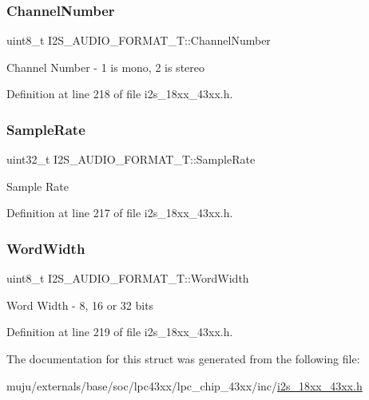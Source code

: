 \subsubsection{\texorpdfstring{Channel\+Number}{ChannelNumber}}
{\footnotesize\ttfamily uint8\+\_\+t I2\+S\+\_\+\+A\+U\+D\+I\+O\+\_\+\+F\+O\+R\+M\+A\+T\+\_\+\+T\+::\+Channel\+Number}

Channel Number -\/ 1 is mono, 2 is stereo 

Definition at line 218 of file i2s\+\_\+18xx\+\_\+43xx.\+h.

\mbox{\label{struct_i2_s___a_u_d_i_o___f_o_r_m_a_t___t_aef370fad5b70b5226a2f8a780bd934d9}} 
\subsubsection{\texorpdfstring{Sample\+Rate}{SampleRate}}
{\footnotesize\ttfamily uint32\+\_\+t I2\+S\+\_\+\+A\+U\+D\+I\+O\+\_\+\+F\+O\+R\+M\+A\+T\+\_\+\+T\+::\+Sample\+Rate}

Sample Rate 

Definition at line 217 of file i2s\+\_\+18xx\+\_\+43xx.\+h.

\mbox{\label{struct_i2_s___a_u_d_i_o___f_o_r_m_a_t___t_a5b21d5d739e0eb7e66c898618fcd4605}} 
\subsubsection{\texorpdfstring{Word\+Width}{WordWidth}}
{\footnotesize\ttfamily uint8\+\_\+t I2\+S\+\_\+\+A\+U\+D\+I\+O\+\_\+\+F\+O\+R\+M\+A\+T\+\_\+\+T\+::\+Word\+Width}

Word Width -\/ 8, 16 or 32 bits 

Definition at line 219 of file i2s\+\_\+18xx\+\_\+43xx.\+h.



The documentation for this struct was generated from the following file\+:\begin{DoxyCompactItemize}
\item 
muju/externals/base/soc/lpc43xx/lpc\+\_\+chip\+\_\+43xx/inc/\hyperlink{i2s__18xx__43xx_8h}{i2s\+\_\+18xx\+\_\+43xx.\+h}\end{DoxyCompactItemize}
